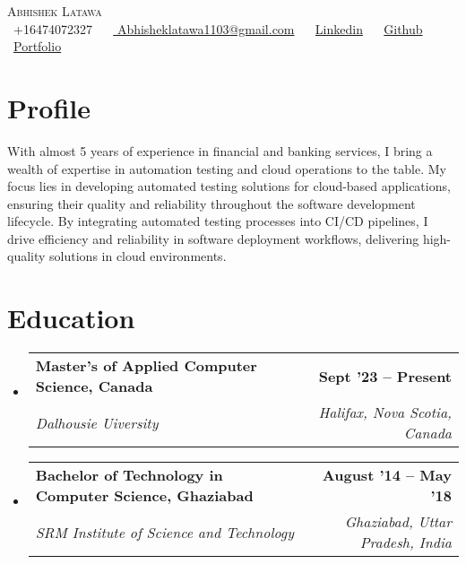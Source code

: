 \documentclass[letterpaper,11pt]{article}
\makeatletter
\newcommand{\resumeSubheading}[4]{
    \vspace{-2pt}\item
    \begin{tabular*}{1.0\textwidth}[t]{l@{\extracolsep{\fill}}r}
        \textbf{#1} & \textbf{\small #2} \\
        \textit{\small#3} & \textit{\small #4} \\
    \end{tabular*}\vspace{-7pt}
}
\newcommand{\resumeSubHeadingListStart}{\begin{itemize}[leftmargin=0.0in, label={}]}
\newcommand{\resumeSubHeadingListEnd}{\end{itemize}}
\makeatother
\begin{document}

\begin{center}
{\Huge \scshape Abhishek Latawa} \\ \vspace{1pt}
\vspace{5pt}
\small \raisebox{-0.1\height}\faPhone\ +16474072327 ~
\raisebox{-0.2\height}\faEnvelope\ \href{mailto:yashbest005@gmail.com}{ Abhisheklatawa1103@gmail.com} ~
\raisebox{-0.2\height}\faLinkedin\ \href{https://www.linkedin.com/in/abhishek-latawa-a3177b129/}{Linkedin} ~
\raisebox{-0.2\height}\faGithub\ \href{https://github.com/abhilatawa}{Github} ~ \raisebox{-0.2\height}\faGlobe\ \href{https://read.cv/alatawa}{Portfolio}
\vspace{-8pt}
\end{center}

\section{Profile}
{With almost 5 years of experience in financial and banking services, I bring a wealth of expertise in automation testing and cloud operations to the table. My focus lies in developing automated testing solutions for cloud-based applications, ensuring their quality and reliability throughout the software development lifecycle. By integrating automated testing processes into CI/CD pipelines, I drive efficiency and reliability in software deployment workflows, delivering high-quality solutions in cloud environments.}


\section{Education}
\resumeSubHeadingListStart
\resumeSubheading
{Master's of Applied Computer Science, Canada}{Sept '23 -- Present}
{Dalhousie Uiversity }{Halifax, Nova Scotia, Canada}
\resumeSubheading
{Bachelor of Technology in Computer Science, Ghaziabad}{August '14 -- May '18}
{SRM Institute of Science and Technology}{Ghaziabad, Uttar Pradesh, India}
\resumeSubHeadingListEnd
\end{document}
